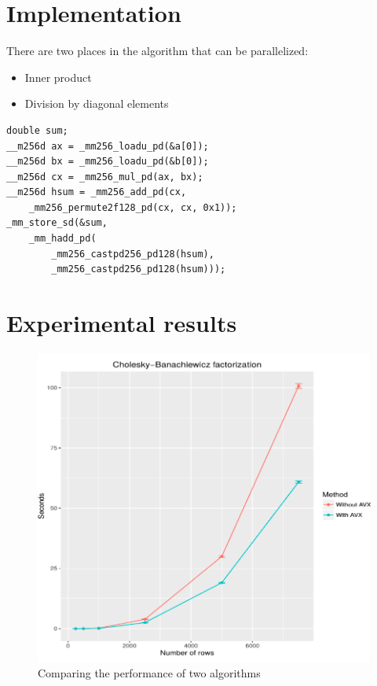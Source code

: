 \documentclass[sigplan]{acmart}
\begin{document}
\section{Implementation}
There are two places in the algorithm that can be parallelized:

\begin{itemize}
\item Inner product
\item Division by diagonal elements
\end{itemize}

\lstset {language=C++}
\begin{lstlisting}
double sum;
__m256d ax = _mm256_loadu_pd(&a[0]);
__m256d bx = _mm256_loadu_pd(&b[0]);
__m256d cx = _mm256_mul_pd(ax, bx);
__m256d hsum = _mm256_add_pd(cx,
    _mm256_permute2f128_pd(cx, cx, 0x1));
_mm_store_sd(&sum,
    _mm_hadd_pd(
        _mm256_castpd256_pd128(hsum),
        _mm256_castpd256_pd128(hsum)));
\end{lstlisting}

\section{Experimental results}

\begin{figure}[H]
  \begin{center}
  \includegraphics[width=\linewidth]{img/experiment}
  \caption{Comparing the performance of two algorithms}
  \end{center}
\end{figure}




\end{document}
